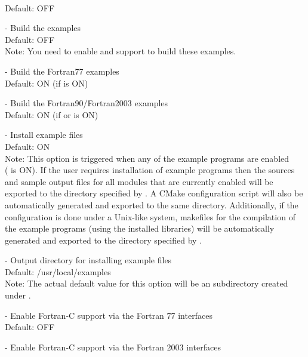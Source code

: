 \begin{description}
  \\
  Default: OFF
\item[\id{EXAMPLES\_ENABLE\_RAJA}] -
  Build the {\sundials} {\raja} examples
  \\
  Default: OFF
  \\
  Note: You need to enable {\cuda} and {\raja} support to build these examples.
\item[\id{EXAMPLES\_ENABLE\_F77}] -
  Build the {\sundials} Fortran77 examples
  \\
  Default: ON (if  is ON)
\item[\id{EXAMPLES\_ENABLE\_F90}] -
  Build the {\sundials} Fortran90/Fortran2003 examples
  \\
  Default: ON (if  or  is ON)
\item[\id{EXAMPLES\_INSTALL}] - 
  Install example files
  \\
  Default: ON
  \\
  Note: This option is triggered when any of the {\sundials}
  example programs are enabled \\
  ( is ON). If the user requires
  installation of example programs then the sources and sample output files
  for all {\sundials} modules that are currently enabled will be exported to
  the directory specified by . A CMake configuration
  script will also be automatically generated and exported to the same directory.
  Additionally, if the configuration is done under a Unix-like system, makefiles
  for the compilation of the example programs (using the installed {\sundials} libraries)
  will be automatically generated and exported to the directory
  specified by .
\item[\id{EXAMPLES\_INSTALL\_PATH}] - 
  Output directory for installing example files
  \\
  Default: /usr/local/examples
  \\
  Note: The actual default value for this option will be an 
  subdirectory created under .
\item[\id{F77\_INTERFACE\_ENABLE}] - 
  Enable Fortran-C support via the Fortran 77 interfaces    
  \\
  Default: OFF 
\item[\id{F2003\_INTERFACE\_ENABLE}] - 
  Enable Fortran-C support via the Fortran 2003 interfaces    
  \\

\end{description}

